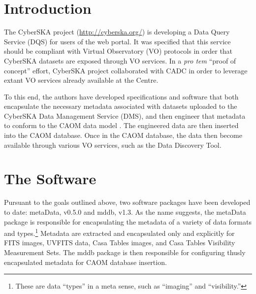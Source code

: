 \section{Introduction}
The CyberSKA project  (\url{http://cyberska.org/}) is developing a Data Query Service (DQS) for users of the web portal. It was specified that this service should be compliant with Virtual Observatory (VO) protocols in order that CyberSKA datasets are exposed through VO services. In a \textit{pro tem} ``proof of concept'' effort, CyberSKA project collaborated with CADC in order to leverage extant VO services already available at the Centre.

To this end, the authors have developed  specifications and software that both encapsulate the necessary metadata associated with datasets uploaded to the  CyberSKA Data Management Service (DMS), and then engineer that metadata to conform to the CAOM data model \citep{dowler_2007}. The engineered data are then inserted into the CAOM database. Once in the CAOM database, the data then become available through various VO services, such as the Data Discovery Tool. 

\section{The Software}
Pursuant to the goals outlined above, two software packages have been developed to date: metaData, v0.5.0 and mddb, v1.3. As the name suggests, the metaData package is responsible for encapsulating the metadata of a variety of data formats and types.\footnote{These are data ``types'' in a meta sense, such as ``imaging'' and ``visibility.''} Metadata are extracted and encapsulated only and explicitly for FITS images, UVFITS data, Casa Tables images, and Casa Tables Visibility Measurement Sets. The mddb package is then responsible for configuring thusly encapsulated metadata for CAOM database insertion.

